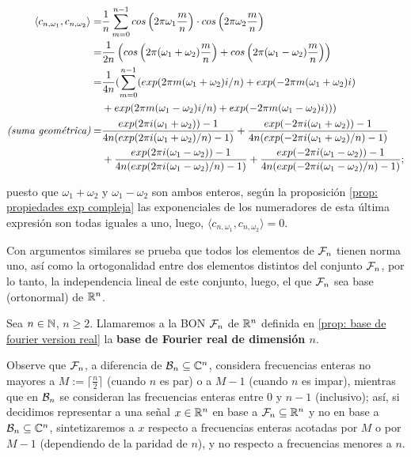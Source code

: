 \begin{align*}
\langle c_{n, \omega_{1}} , c_{n, \omega_{2}} \rangle = &
\frac{1}{n} \sum\limits_{m=0}^{n-1}cos \left(2 \pi \omega_{1} \frac{m}{n} \right) \cdot 
cos \left(2 \pi \omega_{2} \frac{m}{n} \right) \\
= &\frac{1}{2n} \left(
cos \left(2 \pi (\omega_{1} + \omega_{2}) \frac{m}{n} \right) +
cos \left(2 \pi (\omega_{1} - \omega_{2}) \frac{m}{n} \right)
\right) \\
= & \frac{1}{4n} (
\sum\limits_{m=0}^{n-1}
(exp(2 \pi m(\omega_{1}+\omega_{2})i/n) +
exp(-2 \pi m(\omega_{1}+\omega_{2})i) \\
&  + exp(2 \pi m(\omega_{1}-\omega_{2})i/n) +
exp(-2 \pi m(\omega_{1}-\omega_{2})i)) )\\
\textit{(suma geométrica)} = & 
\frac{exp(2 \pi i (\omega_{1}+\omega_{2}))-1}{4n (exp(2 \pi i (\omega_{1}+\omega_{2})/n)-1)} +
\frac{exp(- 2 \pi i (\omega_{1}+\omega_{2}))-1}{4n (exp(-2 \pi i (\omega_{1}+\omega_{2})/n)-1)}
\\
& + 
\frac{exp(2 \pi i (\omega_{1}-\omega_{2}))-1}{4n (exp(2 \pi i (\omega_{1}-\omega_{2})/n)-1)} +
\frac{exp(- 2 \pi i (\omega_{1}-\omega_{2}))-1}{4n (exp(-2 \pi i (\omega_{1}-\omega_{2})/n)-1)};
\\
\end{align*}

\noindent
puesto que $\omega_{1}+\omega_{2}$ y $\omega_{1}-\omega_{2}$
son ambos enteros, según la proposición 
\ref{prop: propiedades exp compleja} las exponenciales de los numeradores
de esta última expresión son todas iguales a uno, luego, 
$\langle c_{n, \omega_{1}} , c_{n, \omega_{2}} \rangle  =0$. 


Con argumentos similares se prueba 
que todos los elementos de $\mathcal{F}_{n}$ tienen norma uno, así como
la ortogonalidad entre dos elementos
distintos del conjunto $\mathcal{F}_{n}$, por lo tanto, la independencia lineal de
este conjunto, luego, el que $\mathcal{F}_{n}$ sea base 
(ortonormal) de $\mathbb{R}^{n}$.


\QEDB
\vspace{0.2cm}



\begin{defi}
Sea $n \in \mathbb{N}$, $n \geq 2$. Llamaremos a la BON
$\mathcal{F}_{n}$ de $\mathbb{R}^{n}$ definida en \ref{prop: base de fourier version real}
la \textbf{base de Fourier real de dimensión $n$}.
\end{defi}

\begin{nota}
\label{nota: frecuencias en las bases de fourier}
Observe que $\mathcal{F}_{n}$, a diferencia de $\mathcal{B}_{n} \subseteq \mathbb{C}^{n}$, 
considera frecuencias enteras no mayores a $M := \lceil \frac{n}{2} \rceil$
(cuando $n$ es par) o a $M-1$ (cuando $n$ es impar), mientras que
en $\mathcal{B}_{n}$ se consideran las frecuencias enteras entre $0$
y $n-1$ (inclusivo); así, si decidimos representar
a una señal $x \in \mathbb{R}^{n}$ en base a $\mathcal{F}_{n} \subseteq \mathbb{R}^{n}$
y no en base a $\mathcal{B}_{n} \subseteq \mathbb{C}^{n}$, sintetizaremos a $x$
respecto a frecuencias enteras acotadas por $M$ o por $M-1$ 
(dependiendo de la paridad de $n$), y no respecto a frecuencias
menores a $n$.
\end{nota}

